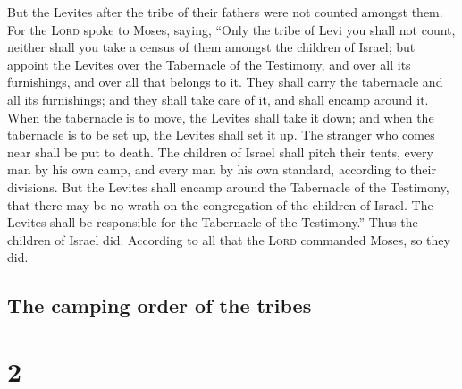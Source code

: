  But the Levites after the tribe of their fathers were
not counted amongst them.  For the \textsc{Lord} spoke to
Moses, saying,  ``Only the tribe of Levi you shall not
count, neither shall you take a census of them amongst the children of
Israel;  but appoint the Levites over the Tabernacle of
the Testimony, and over all its furnishings, and over all that belongs
to it. They shall carry the tabernacle and all its furnishings; and they
shall take care of it, and shall encamp around it.  When
the tabernacle is to move, the Levites shall take it down; and when the
tabernacle is to be set up, the Levites shall set it up. The stranger
who comes near shall be put to death.  The children of
Israel shall pitch their tents, every man by his own camp, and every man
by his own standard, according to their divisions.  But
the Levites shall encamp around the Tabernacle of the Testimony, that
there may be no wrath on the congregation of the children of Israel. The
Levites shall be responsible for the Tabernacle of the Testimony.''
 Thus the children of Israel did. According to all that
the \textsc{Lord} commanded Moses, so they did.

\hypertarget{the-camping-order-of-the-tribes}{%
\subsection{The camping order of the
tribes}\label{the-camping-order-of-the-tribes}}

\hypertarget{section-1}{%
\section{2}\label{section-1}}

